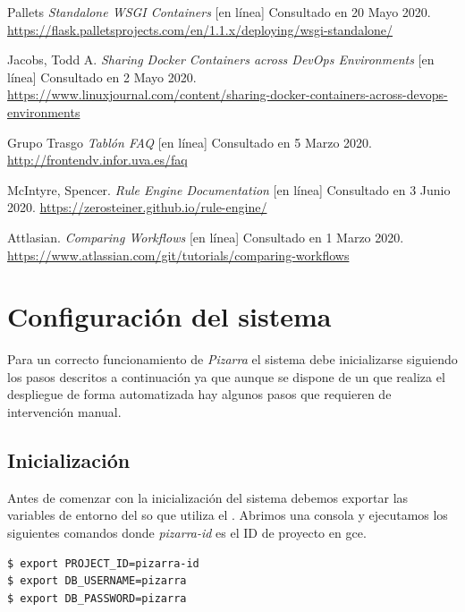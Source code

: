 \documentclass[11pt,spanish,listoffigures,listoftables]{tfgetsinf}
\begin{document}
\begin{thebibliography}{10}
	Pallets \textit{Standalone WSGI Containers} [en línea]
	\newblock Consultado en 20 Mayo 2020.
	\url{https://flask.palletsprojects.com/en/1.1.x/deploying/wsgi-standalone/}
	
	Jacobs, Todd A. \textit{Sharing Docker Containers across DevOps Environments} [en línea]
	\newblock Consultado en 2 Mayo 2020.
	\url{https://www.linuxjournal.com/content/sharing-docker-containers-across-devops-environments}
	
	Grupo Trasgo \textit{Tablón FAQ} [en línea]
	\newblock Consultado en 5 Marzo 2020.
	\url{http://frontendv.infor.uva.es/faq}
	
	McIntyre, Spencer. \textit{Rule Engine Documentation} [en línea]
	\newblock Consultado en 3 Junio 2020.
	\url{https://zerosteiner.github.io/rule-engine/}
	
	Attlasian. \textit{Comparing Workflows} [en línea]
	\newblock Consultado en 1 Marzo 2020.
	\url{https://www.atlassian.com/git/tutorials/comparing-workflows}


\end{thebibliography}
\cleardoublepage

\APPENDIX

\chapter{Configuración del sistema}

Para un correcto funcionamiento de \textit{Pizarra} el sistema debe inicializarse siguiendo los pasos descritos a continuación ya que aunque se dispone de un  que realiza el despliegue de forma automatizada hay algunos pasos que requieren de intervención manual.

\section{Inicialización}

Antes de comenzar con la inicialización del sistema debemos exportar las variables de entorno del \acrshort{so} que utiliza el . Abrimos una consola y ejecutamos los siguientes comandos donde \textit{pizarra-id} es el ID de proyecto en \acrfull{gce}.

\begin{lstlisting}[style=ascii-tree]
$ export PROJECT_ID=pizarra-id
$ export DB_USERNAME=pizarra
$ export DB_PASSWORD=pizarra
\end{lstlisting}
\end{document}

